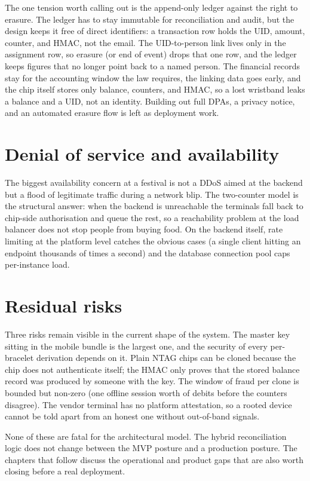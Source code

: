 The one tension worth calling out is the append-only ledger against the right to erasure. The ledger has to stay immutable for reconciliation and audit, but the design keeps it free of direct identifiers: a transaction row holds the UID, amount, counter, and HMAC, not the email. The UID-to-person link lives only in the assignment row, so erasure (or end of event) drops that one row, and the ledger keeps figures that no longer point back to a named person. The financial records stay for the accounting window the law requires, the linking data goes early, and the chip itself stores only balance, counters, and HMAC, so a lost wristband leaks a balance and a UID, not an identity. Building out full DPAs, a privacy notice, and an automated erasure flow is left as deployment work.

\section{Denial of service and availability}
\label{sec:dos}

The biggest availability concern at a festival is not a DDoS aimed at the backend but a flood of legitimate traffic during a network blip. The two-counter model is the structural answer: when the backend is unreachable the terminals fall back to chip-side authorisation and queue the rest, so a reachability problem at the load balancer does not stop people from buying food. On the backend itself, rate limiting at the platform level catches the obvious cases (a single client hitting an endpoint thousands of times a second) and the database connection pool caps per-instance load.

\section{Residual risks}
\label{sec:residual-risks}

Three risks remain visible in the current shape of the system. The master key sitting in the mobile bundle is the largest one, and the security of every per-bracelet derivation depends on it. Plain NTAG chips can be cloned because the chip does not authenticate itself; the HMAC only proves that the stored balance record was produced by someone with the key. The window of fraud per clone is bounded but non-zero (one offline session worth of debits before the counters disagree). The vendor terminal has no platform attestation, so a rooted device cannot be told apart from an honest one without out-of-band signals.

None of these are fatal for the architectural model. The hybrid reconciliation logic does not change between the MVP posture and a production posture. The chapters that follow discuss the operational and product gaps that are also worth closing before a real deployment.
